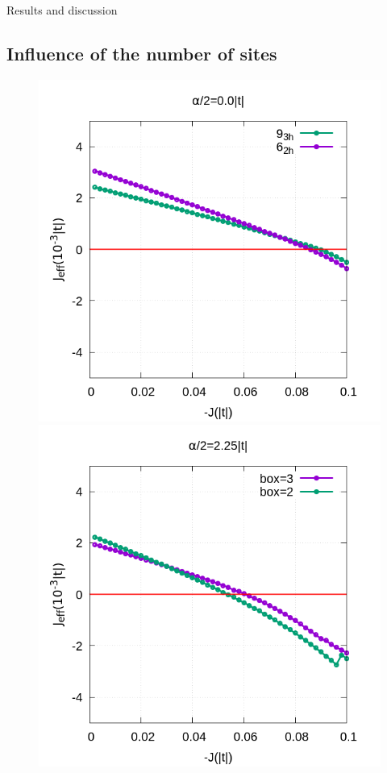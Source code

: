 \documentclass[12pt,twoside]{report}
\begin{document}
\begin{chapter}{Results and discussion}
	\subsection{Influence of the number of sites}
	\begin{figure}[h!]
		\centering
		\hspace{-2cm}
		\begin{minipage}{0.4\textwidth}
			\includegraphics[scale=0.3]{Jeff_vs_J_sites_3-xrep-0.png}
		\end{minipage}
		\hspace{2cm}
		\begin{minipage}{0.4\textwidth}
			\includegraphics[scale=0.3]{Jeff_vs_J_sites_3-xrep-225.png}

\end{minipage}
\end{figure}
\end{chapter}
\end{document}
